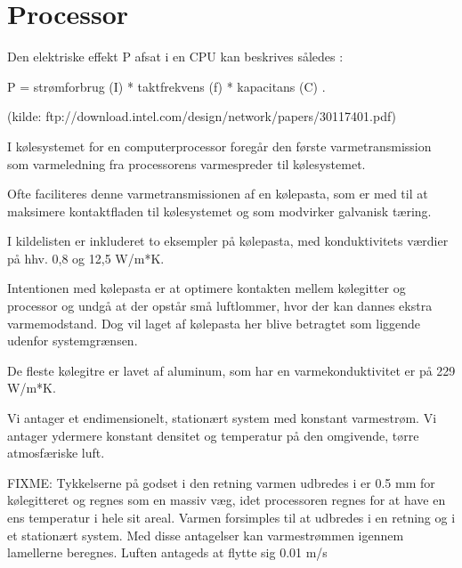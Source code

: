 \section{Processor}

Den elektriske effekt P afsat i en CPU kan beskrives således :

 P = strømforbrug (I) * taktfrekvens (f) * kapacitans (C) .

 (kilde: ftp://download.intel.com/design/network/papers/30117401.pdf)

I kølesystemet for en computerprocessor foregår den første varmetransmission som varmeledning fra processorens varmespreder til kølesystemet.

Ofte faciliteres denne varmetransmissionen af en kølepasta, som er med til at maksimere kontaktfladen til kølesystemet og som modvirker galvanisk tæring.

I kildelisten er inkluderet to eksempler på kølepasta, med konduktivitets værdier på hhv. 0,8 og 12,5 W/m*K.

Intentionen med kølepasta er at optimere kontakten mellem kølegitter og processor og undgå at der opstår små luftlommer, hvor der kan dannes ekstra varmemodstand. Dog vil laget af kølepasta her blive betragtet som liggende udenfor systemgrænsen.

De fleste kølegitre er lavet af aluminum, som har en varmekonduktivitet er på 229 W/m*K.

Vi antager et endimensionelt, stationært system med konstant varmestrøm. Vi antager ydermere konstant densitet og temperatur på den omgivende, tørre atmosfæriske luft.

FIXME:
Tykkelserne på godset i den retning varmen udbredes i er 0.5 mm for kølegitteret og regnes som en massiv væg, idet processoren regnes for at have en ens temperatur i hele sit areal.  Varmen forsimples til at udbredes i en retning og i et stationært system.  Med disse antagelser kan varmestrømmen igennem lamellerne beregnes.
Luften antageds at flytte sig 0.01 m/s